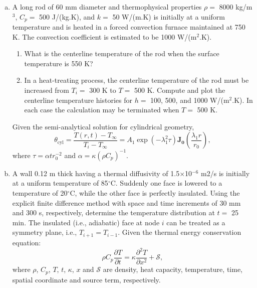 \documentclass[calculator,handbook,sample]{exam_newMarcus2}
\begin{document}
\begin{question}
%
\begin{enumerate}[(a)]

\item A long rod of 60 mm diameter and thermophysical properties $\rho=$ 8000 kg/m$^{3}$, $C_{p}=$ 500 J/(kg.K), and $k=$ 50 W/(m.K) is initially at a uniform temperature and is heated in a forced convection furnace maintained at 750 K. The convection coefficient is estimated to be 1000 W/(m$^{2}$.K). 
  \begin{enumerate}
     \item What is the centerline temperature of the rod when the surface temperature is 550 K?
     \item In a heat-treating process, the centerline temperature of the rod must be increased from $T_{i}=$ 300 K to $T=$ 500 K. Compute and plot the centerline temperature histories for $h=$ 100, 500, and 1000 W/(m$^{2}$.K). In each case the calculation may be terminated when $T=$ 500 K.
  \end{enumerate}
Given the semi-analytical solution for cylindrical geometry,
\begin{displaymath}
\theta_{\text{cyl}} = \displaystyle\frac{T(r,t)-T_{\infty}}{T_{i}-T_{\infty}} = A_{1}\exp\left({-\lambda_{1}^{2}\tau}\right)\mathbf{J_{0}}\left(\frac{\lambda_{1}r}{r_{0}}\right),
\end{displaymath}
where $\tau=\alpha t r_{0}^{-2}$ and $\alpha=\kappa\left(\rho C_{p}\right)^{-1}$.



\item A wall 0.12 m thick having a thermal diffusivity of 1.5$\times$10$^{-6}$ m2/s is initially at a uniform temperature of 85$^{\circ}$C. Suddenly one face is lowered to a temperature of 20$^{\circ}$C, while the other face is perfectly insulated. Using the explicit finite difference method with space and time increments of 30 mm and 300 s, respectively, determine the temperature distribution at $t=$ 25 min. The insulated (i.e., adiabatic) face at node $i$ can be treated as a symmetry plane, i.e., $T_{i+1}=T_{i-1}$. Given the thermal energy conservation equation:
\begin{displaymath}
\rho C_{p} \frac{\partial T}{\partial t} = \kappa \frac{\partial^{2} T}{\partial x^{2}} + \mathcal{S},
\end{displaymath}
where $\rho$, $C_{p}$, $T$, $t$, $\kappa$, $x$ and $\mathcal{S}$ are density, heat capacity, temperature, time, spatial coordinate and source term, respectively.~
\end{enumerate} 
\end{question}


\vfill 

{
  
}
\end{document}

